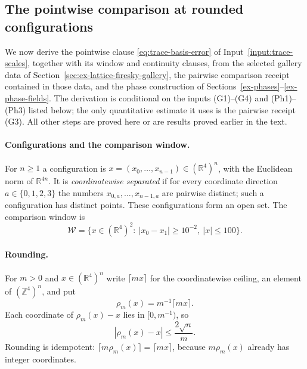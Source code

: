 \subsection{The pointwise comparison at rounded configurations}
\label{subsec:trace-rounded-comparison}

We now derive the pointwise clause \eqref{eq:trace-basis-error} of
Input~\ref{input:trace-scales}, together with its window and continuity
clauses, from the selected gallery data of
Section~\ref{sec:ex-lattice-firesky-gallery}, the pairwise comparison
receipt contained in those data, and the phase construction of
Sections~\ref{ex-phases}--\ref{ex-phase-fields}. The derivation is
conditional on the inputs (G1)--(G4) and (Ph1)--(Ph3) listed below; the
only quantitative estimate it uses is the pairwise receipt (G3). All other
steps are proved here or are results proved earlier in the text.

\paragraph{Configurations and the comparison window.}
For $n\ge1$ a configuration is $x=(x_0,\ldots,x_{n-1})\in(\mathbb
R^4)^n$, with the Euclidean norm of $\mathbb R^{4n}$. It is
\emph{coordinatewise separated} if for every coordinate direction
$a\in\{0,1,2,3\}$ the numbers $x_{0,a},\ldots,x_{n-1,a}$ are pairwise
distinct; such a configuration has distinct points. These configurations
form an open set. The comparison window is
\[
 \mathcal W=\{x\in(\mathbb R^4)^2:\ |x_0-x_1|\ge10^{-2},\ |x|\le100\}.
\]

\paragraph{Rounding.}
For $m>0$ and $x\in(\mathbb R^4)^n$ write $\lceil mx\rceil$ for the
coordinatewise ceiling, an element of $(\mathbb Z^4)^n$, and put
\[
 \rho_m(x)=m^{-1}\lceil mx\rceil .
\]
Each coordinate of $\rho_m(x)-x$ lies in $[0,m^{-1})$, so
\begin{equation}\label{eq:trace-rounding-error}
 |\rho_m(x)-x|\le \frac{2\sqrt n}{m}.
\end{equation}
Rounding is idempotent: $\lceil m\rho_m(x)\rceil=\lceil mx\rceil$,
because $m\rho_m(x)$ already has integer coordinates.

